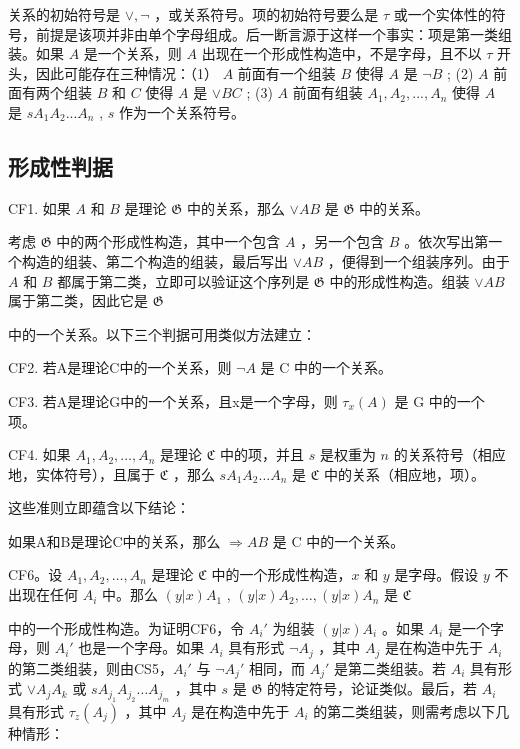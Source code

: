 关系的初始符号是 \(\vee, \neg\) ，或关系符号。项的初始符号要么是 \(\tau\) 或一个实体性的符号，前提是该项并非由单个字母组成。后一断言源于这样一个事实：项是第一类组装。如果 \(A\) 是一个关系，则 \(A\) 出现在一个形成性构造中，不是字母，且不以 \(\tau\) 开头，因此可能存在三种情况：（1） \(A\) 前面有一个组装 \(B\) 使得 \(A\) 是 \(\neg B\) ; (2) \(A\) 前面有两个组装 \(B\) 和 \(C\) 使得 \(A\) 是 \(\vee BC\) ; (3) \(A\) 前面有组装 \(A_1, A_2, ..., A_n\) 使得 \(A\) 是 \(sA_1A_2 ... A_n\) , \(s\) 作为一个关系符号。

\subsection{形成性判据}

CF1. 如果 \(A\) 和 \(B\) 是理论 \(\mathfrak{G}\) 中的关系，那么 \(\vee AB\) 是 \(\mathfrak{G}\) 中的关系。

考虑 \(\mathfrak{G}\) 中的两个形成性构造，其中一个包含 \(A\) ，另一个包含 \(B\) 。依次写出第一个构造的组装、第二个构造的组装，最后写出 \(\vee AB\) ，便得到一个组装序列。由于 \(A\) 和 \(B\) 都属于第二类，立即可以验证这个序列是 \(\mathfrak{G}\) 中的形成性构造。组装 \(\vee AB\) 属于第二类，因此它是 \(\mathfrak{G}\)

中的一个关系。以下三个判据可用类似方法建立：

CF2. 若A是理论C中的一个关系，则 \(\neg A\) 是 C 中的一个关系。

CF3. 若A是理论G中的一个关系，且x是一个字母，则 \(\tau_{x}(A)\) 是 G 中的一个项。

CF4. 如果 \(A_1, A_2, \ldots, A_n\) 是理论 \(\mathfrak{C}\) 中的项，并且 \(s\) 是权重为 \(n\) 的关系符号（相应地，实体符号），且属于 \(\mathfrak{C}\) ，那么 \(sA_1A_2\ldots A_n\) 是 \(\mathfrak{C}\) 中的关系（相应地，项）。

这些准则立即蕴含以下结论：

如果A和B是理论C中的关系，那么 \(\Longrightarrow AB\) 是 C 中的一个关系。

CF6。设 \(A_1, A_2, \ldots, A_n\) 是理论 \(\mathfrak{C}\) 中的一个形成性构造，\(x\) 和 \(y\) 是字母。假设 \(y\) 不出现在任何 \(A_i\) 中。那么 \((y|x)A_1\) , \((y|x)A_2, \ldots, (y|x)A_n\) 是 \(\mathfrak{C}\)

中的一个形成性构造。为证明CF6，令 \(A_i'\) 为组装 \((y|x)A_i\) 。如果 \(A_i\) 是一个字母，则 \(A_i'\) 也是一个字母。如果 \(A_i\) 具有形式 \(\neg A_j\) ，其中 \(A_j\) 是在构造中先于 \(A_i\) 的第二类组装，则由CS5，\(A_i'\) 与 \(\neg A_j'\) 相同，而 \(A_j'\) 是第二类组装。若 \(A_i\) 具有形式 \(\vee A_jA_k\) 或 \(sA_{j_1}A_{j_2}\ldots A_{j_m}\) ，其中 \(s\) 是 \(\mathfrak{G}\) 的特定符号，论证类似。最后，若 \(A_i\) 具有形式 \(\tau_z(A_j)\) ，其中 \(A_j\) 是在构造中先于 \(A_i\) 的第二类组装，则需考虑以下几种情形：

